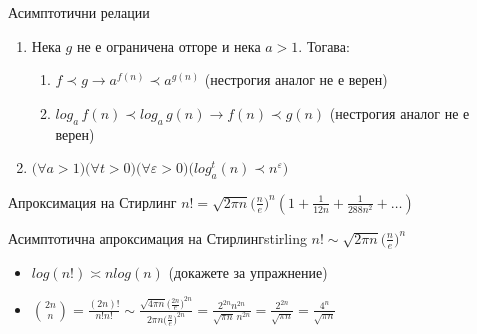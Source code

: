 \begin{boxmainproperties}{Асимптотични релации}{}
\begin{enumerate}
			  точно дефиницията на $\hyperref[bdef-asymp-classes]{\Theta(g)}$.
			  \vspace{-0.15cm}
			  
			  Обратната посока $\textbf{не}$ е вярна.
		\item Нека $g$ не е ограничена отгоре и нека $a>1$. Тогава:
			  \begin{enumerate}
			  	\item $f\prec g\rightarrow a^{f(n)}\prec a^{g(n)}$ (нестрогия аналог $\textbf{не}$ е верен)
			  	\item $log_a\,f(n)\prec log_a\,g(n)\rightarrow f(n)\prec g(n)$ (нестрогия аналог $\textbf{не}$ е верен)
			  \end{enumerate}
		\item $\big(\forall a>1\big)\big(\forall t>0\big)\big(\forall\varepsilon>0\big)\big(log_a^t(n)\prec n^\varepsilon\big)$
	\end{enumerate}
\end{boxmainproperties}

\begin{boxfact}{Апроксимация на Стирлинг}{}
	$n!=\sqrt{2\pi n}\big(\frac{n}{e}\big)^n(1+\frac{1}{12n}+\frac{1}{288n^2}+\dots)$
\end{boxfact}

\begin{boxcorollary}{Асимптотична апроксимация на Стирлинг}{stirling}%
	$n!\sim\sqrt{2\pi n}\big(\frac{n}{e}\big)^n$
\end{boxcorollary}

\begin{application*}
	\leavevmode
	\begin{itemize}
		\item $log(n!)\asymp nlog(n)$ (докажете за упражнение)
		\item $\binom{2n}{n}=\frac{(2n)!}{n!n!}\sim\frac{\sqrt{4\pi n}\big(\frac{2n}{e}\big)^{2n}}{2\pi n\big(\frac{n}{e}\big)^{2n}}=\frac{2^{2n}n^{2n}}{\sqrt{\pi n}\,n^{2n}}=\frac{2^{2n}}{\sqrt{\pi n}}=\frac{4^n}{\sqrt{\pi n}}$
	\end{itemize}
\end{application*}

